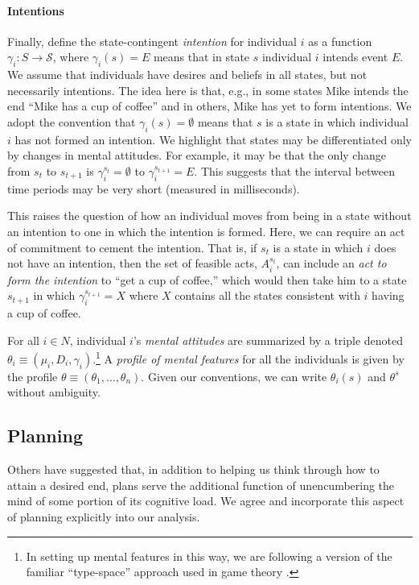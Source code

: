 \documentclass[
11pt,
titlepage,
reqno,
]{article}%
\theoremstyle{definition}
\begin{document}
	\paragraph{Intentions \label{para: intentions}}
	
	Finally, define the state-contingent \textit{intention} for individual $i$ as a function $\gamma_i:S\rightarrow \mathcal{S}$, where $\gamma_i(s)=E$ means that in state $s$ individual $i$ intends event $E$. 
	We assume that individuals have desires and beliefs in all states, but not necessarily intentions. 
	The idea here is that, e.g., in some states Mike intends the end ``Mike has a cup of coffee'' and in others, Mike has yet to form intentions.
	We adopt the convention that $\gamma_i(s)=\emptyset$ means that $s$ is a state in which individual $i$ has not formed an intention. 
	We highlight that states may be differentiated only by changes in mental attitudes. 
	For example, it may be that the only change from $s_t$ to $s_{t+1}$ is $\gamma_i^{s_t}=\emptyset$ to $\gamma_i^{s_{t+1}}=E$.
	This suggests that the interval between time periods may be very short (measured in milliseconds).
	
	This raises the question of how an individual moves from being in a state without an intention to one in which the intention is formed. 
	Here, we can require an act of commitment to cement the intention. 
	That is, if $s_t$ is a state in which $i$ does not have an intention, then the set of feasible acts, $A^{s_t}_i$, can include an \textit{act to form the intention} to ``get a cup of coffee,'' which would then take him to a state $s_{t+1}$ in which $\gamma_i^{s_{t+1}}=X$ where $X$ contains all the states consistent with $i$ having a cup of coffee.
	
	For all $i\in N$, individual $i$'s \textit{mental attitudes} are summarized by a triple denoted $\theta_i\equiv(\mu_i,D_i,\gamma_i)$.\footnote
	{
		In setting up mental features in this way, we are following a version of the familiar ``type-space'' approach used in game theory \citep[See][]{Harsanyi1967, Mertens1985a}. 
	} 
	A \textit{profile of mental features} for all the individuals is given by the profile $\theta\equiv(\theta_1,\ldots,\theta_n)$. 
	Given our conventions, we can write $\theta_i(s)$ and $\theta^s$ without ambiguity.
	
	
\subsection{Planning}
Others have suggested that, in addition to helping us think through how to attain a desired end, plans serve the additional function of unencumbering the mind of some portion of its cognitive load. 
We agree and incorporate this aspect of planning explicitly into our analysis.
	
\end{document}

